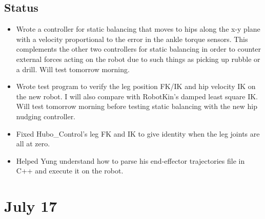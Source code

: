 \documentclass[letterpaper, 10 pt]{report}
\begin{document}
\subsection*{Status}
\begin{itemize}
\item Wrote a controller for static balancing that moves to hips along the x-y plane with a velocity proportional to the error in the ankle torque sensors. This complements the other two controllers for static balancing in order to counter external forces acting on the robot due to such things as picking up rubble or a drill. Will test tomorrow morning.
\item Wrote test program to verify the leg position FK/IK and hip velocity IK on the new robot. I will also compare with RobotKin's damped least square IK. Will test tomorrow morning before testing static balancing with the new hip nudging controller.
\item Fixed Hubo\_Control's leg FK and IK to give identity when the leg joints are all at zero.
\item Helped Yung understand how to parse his end-effector trajectories file in C++ and execute it on the robot.
\end{itemize}

\section*{July 17}
\end{document}
